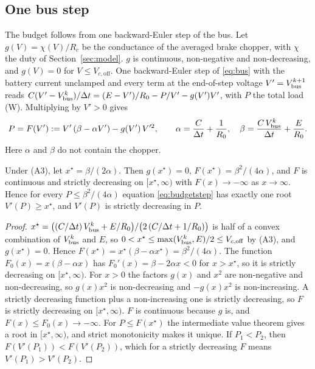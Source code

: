 \subsection{One bus step}
The budget follows from one backward-Euler step of the bus. Let $g(V)=\chi(V)/R_c$ be the conductance of the averaged brake chopper, with $\chi$ the duty of Section~\ref{sec:model}. $g$ is continuous, non-negative and non-decreasing, and $g(V)=0$ for $V\le V_{c,\mathrm{off}}$. One backward-Euler step of \eqref{eq:bus} with the battery current unclamped and every term at the end-of-step voltage $V'=V_{\mathrm{bus}}^{k+1}$ reads
$C(V'-V_{\mathrm{bus}}^k)/\Delta t = (E-V')/R_0 - P/V' - g(V')V'$, with $P$ the total load (W). Multiplying by $V'>0$ gives
\begin{equation}
P = F(V') := V'\,(\beta - \alpha V') - g(V')\,V'^2, \qquad \alpha = \frac{C}{\Delta t}+\frac{1}{R_0},\quad \beta = \frac{C\,V_{\mathrm{bus}}^k}{\Delta t} + \frac{E}{R_0}.
\label{eq:budgetstep}
\end{equation}
Here $\alpha$ and $\beta$ do not contain the chopper.
\begin{lemma}\label{lem:step}
Under (A3), let $x^\star = \beta/(2\alpha)$. Then $g(x^\star)=0$, $F(x^\star)=\beta^2/(4\alpha)$, and $F$ is continuous and strictly decreasing on $[x^\star,\infty)$ with $F(x)\to-\infty$ as $x\to\infty$. Hence for every $P\le \beta^2/(4\alpha)$ equation \eqref{eq:budgetstep} has exactly one root $V'(P)\ge x^\star$, and $V'(P)$ is strictly decreasing in $P$.
\end{lemma}
\begin{proof}
$x^\star = \bigl((C/\Delta t)\,V_{\mathrm{bus}}^k + E/R_0\bigr)/\bigl(2\,(C/\Delta t+1/R_0)\bigr)$ is half of a convex combination of $V_{\mathrm{bus}}^k$ and $E$, so $0 < x^\star \le \max(V_{\mathrm{bus}}^k,E)/2 \le V_{c,\mathrm{off}}$ by (A3), and $g(x^\star)=0$. Hence $F(x^\star) = x^\star(\beta-\alpha x^\star) = \beta^2/(4\alpha)$.
The function $F_0(x)=x(\beta-\alpha x)$ has $F_0'(x) = \beta-2\alpha x < 0$ for $x>x^\star$, so it is strictly decreasing on $[x^\star,\infty)$. For $x>0$ the factors $g(x)$ and $x^2$ are non-negative and non-decreasing, so $g(x)x^2$ is non-decreasing and $-g(x)x^2$ is non-increasing. A strictly decreasing function plus a non-increasing one is strictly decreasing, so $F$ is strictly decreasing on $[x^\star,\infty)$. $F$ is continuous because $g$ is, and $F(x)\le F_0(x)\to-\infty$.
For $P\le F(x^\star)$ the intermediate value theorem gives a root in $[x^\star,\infty)$, and strict monotonicity makes it unique. If $P_1<P_2$, then $F(V'(P_1)) < F(V'(P_2))$, which for a strictly decreasing $F$ means $V'(P_1)>V'(P_2)$.
\end{proof}
